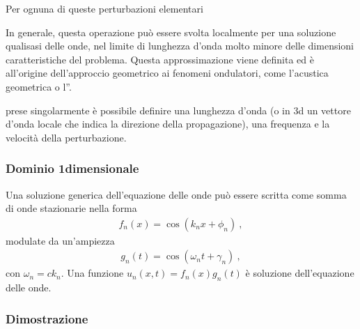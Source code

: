 \documentclass[letterpaper,10pt,italian]{jupyterBook}
\begin{document}
\sphinxAtStartPar
Per ognuna di queste perturbazioni elementari%
\begin{footnote}[1]\sphinxAtStartFootnote
In generale, questa operazione può essere svolta localmente per una soluzione qualisasi delle onde, nel limite di lunghezza d’onda molto minore delle dimensioni caratteristiche del problema. Questa approssimazione viene definita  ed è all’origine dell’approccio geometrico ai fenomeni ondulatori, come l’acustica geometrica o l”{\hyperref[\detokenize{ch/waves/optics-geometric:physics-hs-waves-optics-geometric}]{}}.
%
\end{footnote} prese singolarmente è possibile definire una lunghezza d’onda (o in 3d un vettore d’onda locale che indica la direzione della propagazione), una frequenza e la velocità della perturbazione.


\subsubsection{Dominio 1\sphinxhyphen{}dimensionale}
\label{\detokenize{ch/waves/phenomena:dominio-1-dimensionale}}
\sphinxAtStartPar
{} Una soluzione generica dell’equazione delle onde può essere scritta come somma di onde stazionarie nella forma
\begin{equation*}
\begin{split}f_n(x) = \cos(k_n x + \phi_n) \ ,\end{split}
\end{equation*}
\sphinxAtStartPar
modulate da un’ampiezza
\begin{equation*}
\begin{split}g_n(t) = \cos(\omega_n t + \gamma_n) \ ,\end{split}
\end{equation*}
\sphinxAtStartPar
con \(\omega_n = c k_n\). Una funzione \(u_n(x,t) = f_n(x) g_n(t)\) è soluzione dell’equazione delle onde.
\subsubsection*{Dimostrazione}
\end{document}
